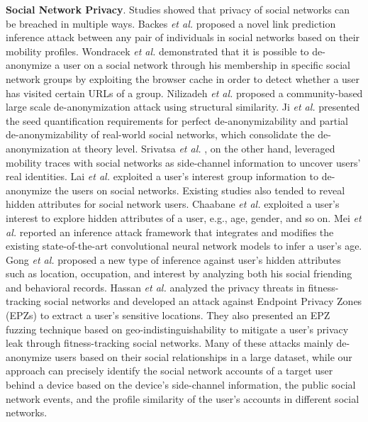 \documentclass[letterpaper,12pt]{article}
\begin{document}
\noindent\textbf{Social Network Privacy}. Studies showed that privacy of social networks can be breached in multiple ways. Backes \emph{et al.} \cite{backes2017identity} proposed a novel link prediction inference attack between any pair of individuals in social networks based on their mobility profiles. Wondracek \emph{et al.} \cite{wondracek2010practical} demonstrated that it is possible to de-anonymize a user on a social network through his membership in specific social network groups by exploiting the browser cache in order to detect whether a user has visited certain URLs of a group. Nilizadeh \emph{et al.} \cite{nilizadeh2014community} proposed a community-based large scale de-anonymization attack using structural similarity. Ji \emph{et al.} \cite{Ji2015OnYS} presented the seed quantification requirements for perfect de-anonymizability and partial de-anonymizability of real-world social networks, which consolidate the de-anonymization at theory level. Srivatsa \emph{et al.} \cite{srivatsa2012deanonymizing}, on the other hand, leveraged mobility traces with social networks as side-channel information to uncover users' real identities. Lai \emph{et al.} \cite{lai2015anonymizing} exploited a user's interest group information to de-anonymize the users on social networks. Existing studies %
also tended to reveal hidden attributes for social network users. Chaabane \emph{et al.} \cite{chaabane2012you} exploited a user's interest to explore hidden attributes of a user, e.g., age, gender, and so on. Mei \emph{et al.} \cite{Mei2018TNSE} reported an inference attack framework that integrates and modifies the existing state-of-the-art convolutional neural network models to infer a user's age. Gong \emph{et al.} \cite{gong2016you} proposed a new type of inference against user's hidden attributes such as location, occupation, and interest by analyzing both his social friending and behavioral records. 
Hassan \emph{et al.} \cite{hassan2018analysis} analyzed the privacy threats in fitness-tracking social networks and developed an attack against Endpoint Privacy Zones (EPZs) to extract a user's sensitive locations. They also presented an EPZ fuzzing technique based on geo-indistinguishability to mitigate a user's privacy leak through fitness-tracking social networks.
Many of these attacks mainly de-anonymize users based on their social relationships in a large dataset, while our approach can precisely identify the social network accounts of a target user behind a device based on the device's side-channel information, the public social network events, and the profile similarity of the user's accounts in different social networks.
\end{document}
